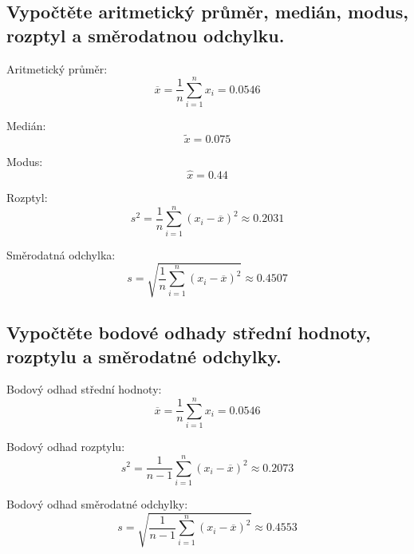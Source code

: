 
\subsection{Vypočtěte aritmetický průměr, medián, modus, rozptyl a směrodatnou odchylku.}

\begin{compactitem}
    \item Aritmetický průměr:
    $${\displaystyle \overline{x} = {\frac {1}{n}} \sum_{i=1}^{n} x_{i} = 0.0546}$$

    \item Medián:
    $${\displaystyle \tilde{x} = 0.075}$$

    \item Modus:
    $${\displaystyle \hat{x} = 0.44}$$

    \item Rozptyl:
    $${\displaystyle s^2 = {\frac {1}{n}} \sum_{i=1}^{n}(x_i - \overline{x})^2} \approx 0.2031$$

    \item Směrodatná odchylka:
    $${\displaystyle s = \sqrt{{\frac {1}{n}} \sum_{i=1}^{n}(x_i - \overline{x})^2}} \approx 0.4507$$
\end{compactitem}


\subsection{Vypočtěte bodové odhady střední hodnoty, rozptylu a směrodatné odchylky.}

\begin{compactitem}
    \item Bodový odhad střední hodnoty:
    $${\displaystyle \overline{x} = {\frac {1}{n}} \sum_{i=1}^{n} x_{i} = 0.0546}$$

    \item Bodový odhad rozptylu:
    $${\displaystyle s^2 = {\frac {1}{n-1}} \sum_{i=1}^{n}(x_i - \overline{x})^2} \approx 0.2073$$

    \item Bodový odhad směrodatné odchylky:
    $${\displaystyle s = \sqrt{{\frac {1}{n-1}} \sum_{i=1}^{n}(x_i - \overline{x})^2}} \approx 0.4553$$
\end{compactitem}



